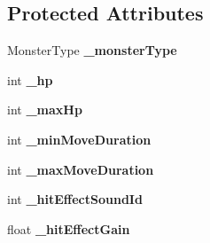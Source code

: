 \subsection*{Protected Attributes}
\begin{DoxyCompactItemize}
\item 
\hypertarget{interface_monster_abbd4c1e252945c29836ec52230b68e0d}{Monster\-Type {\bfseries \-\_\-monster\-Type}}\label{interface_monster_abbd4c1e252945c29836ec52230b68e0d}

\item 
\hypertarget{interface_monster_a3fff58a3c1e96c871a8cb719b6fb46e4}{int {\bfseries \-\_\-hp}}\label{interface_monster_a3fff58a3c1e96c871a8cb719b6fb46e4}

\item 
\hypertarget{interface_monster_a77fe40649400c6f6879af1d777ca2204}{int {\bfseries \-\_\-max\-Hp}}\label{interface_monster_a77fe40649400c6f6879af1d777ca2204}

\item 
\hypertarget{interface_monster_ad6f43e186e085958afcdf503345f03ca}{int {\bfseries \-\_\-min\-Move\-Duration}}\label{interface_monster_ad6f43e186e085958afcdf503345f03ca}

\item 
\hypertarget{interface_monster_a11841c05120f8da2d6514a42e46684e5}{int {\bfseries \-\_\-max\-Move\-Duration}}\label{interface_monster_a11841c05120f8da2d6514a42e46684e5}

\item 
\hypertarget{interface_monster_a56cb2c3759abb243fefe05729a1022ff}{int {\bfseries \-\_\-hit\-Effect\-Sound\-Id}}\label{interface_monster_a56cb2c3759abb243fefe05729a1022ff}

\item 
\hypertarget{interface_monster_af71cd73ed4e1797eee3051a53705dac5}{float {\bfseries \-\_\-hit\-Effect\-Gain}}\label{interface_monster_af71cd73ed4e1797eee3051a53705dac5}

\end{DoxyCompactItemize}
